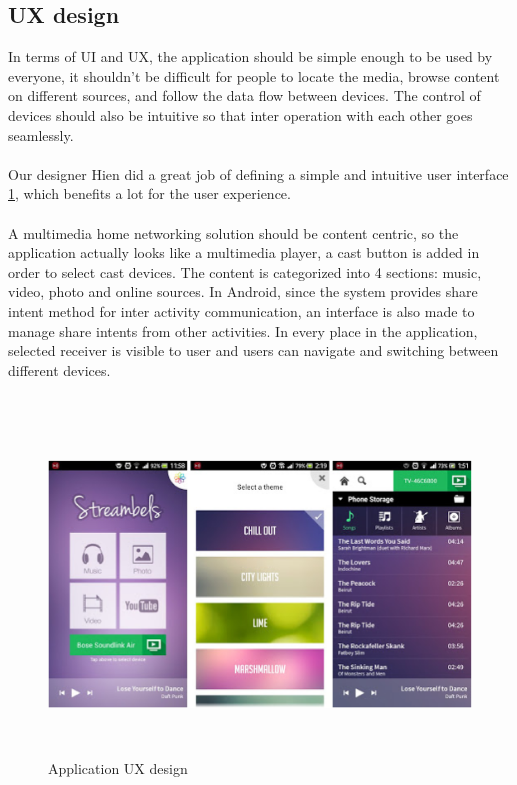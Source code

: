 \subsection{UX design}
In terms of UI and UX, the application should be simple enough to be used by
everyone, it shouldn't be difficult for people to locate the media, browse
content on different sources, and follow the data flow between devices. The
control of devices should also be intuitive so that inter operation with
each other goes seamlessly.\\
\\
Our designer Hien did a great job of defining a simple and intuitive user
interface \ref{chart5}, which benefits a lot for the user experience.\\
\\
A multimedia home networking solution should be content centric, so the
application actually looks like a multimedia player, a cast button is added in
order to select cast devices. The content is categorized into 4 sections: music,
video, photo and online sources. In Android, since the system provides share
intent method for inter activity communication, an interface is also made to
manage share intents from other activities. In every place in the application,
selected receiver is visible to user and users can navigate and switching
between different devices.\\
\\
\begin{figure}[htb]
\centering \includegraphics[height=9cm]{charts/streambels_ui}
\caption{Application UX design \label{chart5}}
\end{figure}

